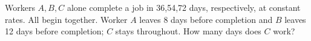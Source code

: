 Workers $A,B,C$ alone complete a job in 36,54,72 days, respectively, at constant rates. All begin together. Worker $A$ leaves 8 days before completion and $B$ leaves 12 days before completion; $C$ stays throughout. How many days does $C$ work?
